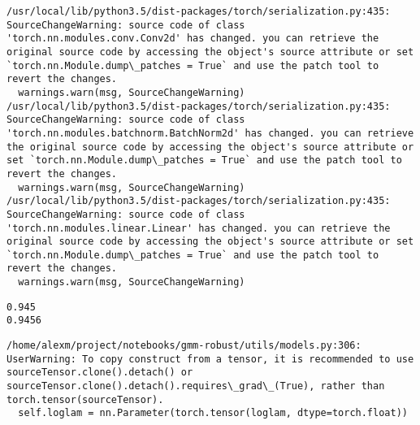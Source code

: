 \documentclass[11pt]{article}
\begin{document}
    \begin{Verbatim}[commandchars=\\\{\}]
/usr/local/lib/python3.5/dist-packages/torch/serialization.py:435: SourceChangeWarning: source code of class 'torch.nn.modules.conv.Conv2d' has changed. you can retrieve the original source code by accessing the object's source attribute or set `torch.nn.Module.dump\_patches = True` and use the patch tool to revert the changes.
  warnings.warn(msg, SourceChangeWarning)
/usr/local/lib/python3.5/dist-packages/torch/serialization.py:435: SourceChangeWarning: source code of class 'torch.nn.modules.batchnorm.BatchNorm2d' has changed. you can retrieve the original source code by accessing the object's source attribute or set `torch.nn.Module.dump\_patches = True` and use the patch tool to revert the changes.
  warnings.warn(msg, SourceChangeWarning)
/usr/local/lib/python3.5/dist-packages/torch/serialization.py:435: SourceChangeWarning: source code of class 'torch.nn.modules.linear.Linear' has changed. you can retrieve the original source code by accessing the object's source attribute or set `torch.nn.Module.dump\_patches = True` and use the patch tool to revert the changes.
  warnings.warn(msg, SourceChangeWarning)

    \end{Verbatim}

    \begin{Verbatim}[commandchars=\\\{\}]
0.945
0.9456

    \end{Verbatim}

    \begin{Verbatim}[commandchars=\\\{\}]
/home/alexm/project/notebooks/gmm-robust/utils/models.py:306: UserWarning: To copy construct from a tensor, it is recommended to use sourceTensor.clone().detach() or sourceTensor.clone().detach().requires\_grad\_(True), rather than torch.tensor(sourceTensor).
  self.loglam = nn.Parameter(torch.tensor(loglam, dtype=torch.float))

    \end{Verbatim}
\end{document}
